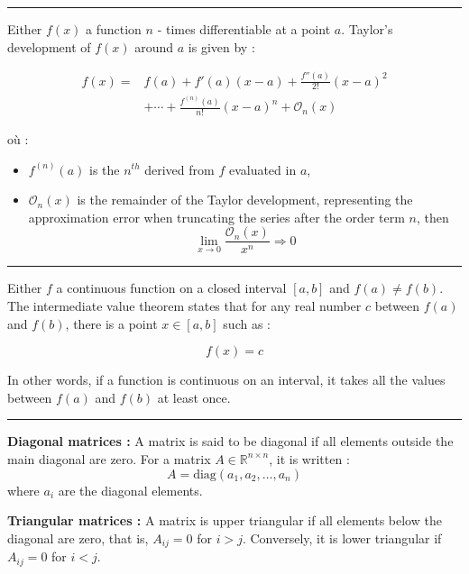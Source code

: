 \hrule
\begin{f}
 
Either \( f(x) \) a function \( n \) - times differentiable at a point \( a \). Taylor's development of \( f(x) \) around \( a \) is given by :

\begin{align*}
 f(x) =& f(a) + f'(a)(x - a) + \frac{f''(a)}{2!}(x - a)^2 \\
 &+ \cdots + \frac{f^{(n)}(a)}{n!}(x - a)^n + \mathcal{O}_n(x)
\end{align*}


où :
\begin{itemize}
    \item \( f^{(n)}(a) \) is the \( n^{th} \) derived from \( f \) evaluated in \( a \),
    \item \( \mathcal{O}_n(x) \) is the remainder of the Taylor development, representing the approximation error when truncating the series after the order term \( n \), then 
    \[
    \lim_{x\rightarrow 0}\frac{\mathcal{O}_n(x) }{x^n}\Rightarrow 0
    \]
\end{itemize}
\end{f}
\hrule
\begin{f} 

Either \( f \) a continuous function on a closed interval \([a, b]\) and \( f(a) \neq f(b) \). The intermediate value theorem states that for any real number \( c \) between \( f(a) \) and \( f(b) \), there is a point \( x \in [a, b] \) such as :

\[
f(x) = c
\]

In other words, if a function is continuous on an interval, it takes all the values between \( f(a) \) and \( f(b) \) at least once.
\end{f}
\hrule
\begin{f}
  
\textbf{Diagonal matrices :}
A matrix is said to be diagonal if all elements outside the main diagonal are zero. For a matrix \( A \in \mathbb{R}^{n \times n} \), it is written :
\[
A = \text{diag}(a_1, a_2, \dots, a_n)
\]
where \( a_i \) are the diagonal elements.

\textbf{Triangular matrices :}
A matrix is upper triangular if all elements below the diagonal are zero, that is, \( A_{ij} = 0 \) for \( i > j \). Conversely, it is lower triangular if \( A_{ij} = 0 \) for \( i < j \).
\end{f}

